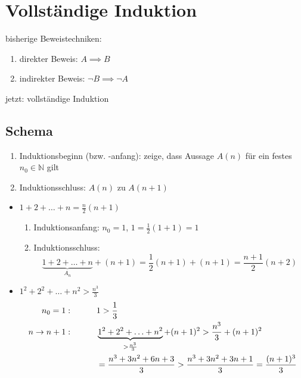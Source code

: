 
\section{Vollständige Induktion}

bisherige Beweistechniken:

\begin{enumerate}
 \item direkter Beweis: $A \implies B$
 \item indirekter Beweis: $\neg B \implies \neg A$
\end{enumerate}
jetzt: vollständige Induktion

\subsection{Schema}

\begin{enumerate}
 \item Induktionsbeginn (bzw. -anfang): zeige, dass Aussage $A(n)$ für ein festes $n_0 \in \mathbb{N}$ gilt
 \item Induktionsschluss: $A(n)$ zu $A(n+1)$
\end{enumerate}

\begin{example}
 \begin{itemize}
  \item $1+2+\ldots+n = \frac n 2 (n+1)$
    \begin{enumerate}
    \item Induktionsanfang: $n_0 = 1$, $1 = \frac 1 2 (1+1) = 1$
    \item Induktionsschluss: \begin{equation*}\underbrace{1+2+\ldots+n}_{A_n} + (n+1) = \frac 1 2 (n+1) + (n+1) = \frac{n+1}2 (n+2)\end{equation*}
    \end{enumerate}
  \item $1^2+2^2+\ldots+n^2 > \frac{n^3}3$
    \begin{align*}
      n_0 = 1:\text{\hspace{1cm}} &1 > \frac 1 3 \text{\hspace{1cm}} \\
      n \rightarrow n + 1 :\text{\hspace{1cm}} &\underbrace{1^2+2^2+\ldots+n^2}_{>\frac{n^3}3}+(n+1)^2 > \frac{n^3}3+(n+1)^2 \\
      &= \frac{n^3+3n^2+6n+3}3 > \frac{n^3+3n^2+3n+1}3 = \frac{(n+1)^3}3
    \end{align*}
 \end{itemize}
\end{example}

